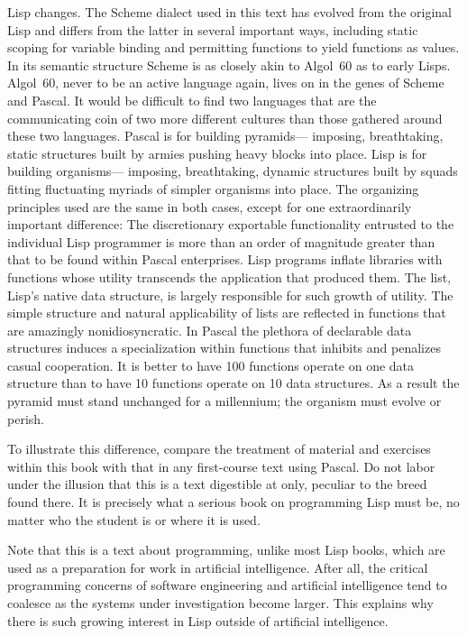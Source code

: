 Lisp changes.
The Scheme dialect used in this text has evolved from the original Lisp and differs from the latter in several important ways, including static scoping for variable binding and permitting functions to yield functions as values.
In its semantic structure Scheme is as closely akin to Algol~60 as to early Lisps.
Algol~60, never to be an active language again, lives on in the genes of Scheme and Pascal.
It would be difficult to find two languages that are the communicating coin of two more different cultures than those gathered around these two languages.
Pascal is for building pyramids---%
imposing, breathtaking, static structures built by armies pushing heavy blocks into place.
Lisp is for building organisms---%
imposing, breathtaking, dynamic structures built by squads fitting fluctuating myriads of simpler organisms into place.
The organizing principles used are the same in both cases, except for one extraordinarily important difference:
The discretionary exportable functionality entrusted to the individual Lisp programmer is more than an order of magnitude greater than that to be found within Pascal enterprises.
Lisp programs inflate libraries with functions whose utility transcends the application that produced them.
The list, Lisp’s native data structure, is largely responsible for such growth of utility.
The simple structure and natural applicability of lists are reflected in functions that are amazingly nonidiosyncratic.
In Pascal the plethora of declarable data structures induces a specialization within functions that inhibits and penalizes casual cooperation.
It is better to have 100 functions operate on one data structure than to have 10 functions operate on 10 data structures.
As a result the pyramid must stand unchanged for a millennium;
the organism must evolve or perish.

To illustrate this difference, compare the treatment of material and exercises within this book with that in any first-course text using Pascal.
Do not labor under the illusion that this is a text digestible at  only, peculiar to the breed found there.
It is precisely what a serious book on programming Lisp must be, no matter who the student is or where it is used.

Note that this is a text about programming, unlike most Lisp books, which are used as a preparation for work in artificial intelligence.
After all, the critical programming concerns of software engineering and artificial intelligence tend to coalesce as the systems under investigation become larger.
This explains why there is such growing interest in Lisp outside of artificial intelligence.

